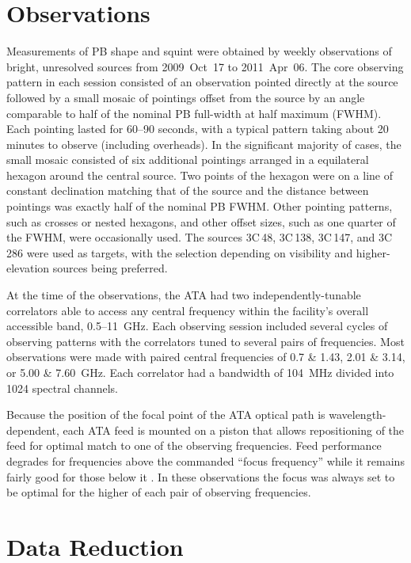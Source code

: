 \documentclass[preprint]{aastex}
\begin{document}
\section{Observations}\label{s.observations}

Measurements of PB shape and squint were obtained by weekly
observations of bright, unresolved sources from 2009~Oct~17 to
2011~Apr~06. The core observing pattern in each session consisted of
an observation pointed directly at the source followed by a small
mosaic of pointings offset from the source by an angle comparable to
half of the nominal PB full-width at half maximum (FWHM). Each
pointing lasted for 60--90 seconds, with a typical pattern taking
about 20 minutes to observe (including overheads). In the significant
majority of cases, the small mosaic consisted of six additional
pointings arranged in a equilateral hexagon around the central
source. Two points of the hexagon were on a line of constant
declination matching that of the source and the distance between
pointings was exactly half of the nominal PB FWHM. Other pointing
patterns, such as crosses or nested hexagons, and other offset sizes,
such as one quarter of the FWHM, were occasionally used.  The sources
3C\,48, 3C\,138, 3C\,147, and 3C\,286 were used as targets, with the
selection depending on visibility and higher-elevation sources being
preferred.

At the time of the observations, the ATA had two independently-tunable
correlators able to access any central frequency within the facility's
overall accessible band, 0.5--11~GHz. Each observing session included
several cycles of observing patterns with the correlators tuned to
several pairs of frequencies. Most observations were made with paired
central frequencies of 0.7 \& 1.43, 2.01 \& 3.14, or 5.00 \&
7.60~GHz. Each correlator had a bandwidth of 104~MHz divided into 1024
spectral channels.

Because the position of the focal point of the ATA optical path is
wavelength-dependent, each ATA feed is mounted on a piston that allows
repositioning of the feed for optimal match to one of the observing
frequencies. Feed performance degrades for frequencies above the
commanded ``focus frequency'' while it remains fairly good for those
below it \citep{Harp2011}. In these observations the focus was always
set to be optimal for the higher of each pair of observing
frequencies.

\section{Data Reduction}\label{s.reduction}
\end{document}
